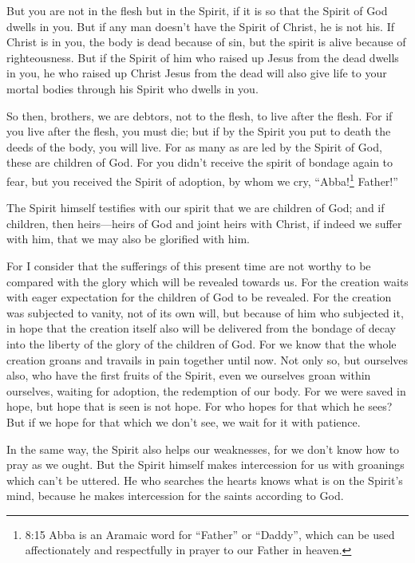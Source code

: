  But you are not in the flesh but in the Spirit, if it is so
that the Spirit of God dwells in you. But if any man doesn't have the
Spirit of Christ, he is not his.  If Christ is in you, the
body is dead because of sin, but the spirit is alive because of
righteousness.  But if the Spirit of him who raised up
Jesus from the dead dwells in you, he who raised up Christ Jesus from
the dead will also give life to your mortal bodies through his Spirit
who dwells in you.

 So then, brothers, we are debtors, not to the flesh, to
live after the flesh.  For if you live after the flesh, you
must die; but if by the Spirit you put to death the deeds of the body,
you will live.  For as many as are led by the Spirit of
God, these are children of God.  For you didn't receive the
spirit of bondage again to fear, but you received the Spirit of
adoption, by whom we cry, ``Abba!\footnote{8:15 Abba is an Aramaic word
  for ``Father'' or ``Daddy'', which can be used affectionately and
  respectfully in prayer to our Father in heaven.} Father!''

 The Spirit himself testifies with our spirit that we are
children of God;  and if children, then heirs---heirs of
God and joint heirs with Christ, if indeed we suffer with him, that we
may also be glorified with him.

 For I consider that the sufferings of this present time
are not worthy to be compared with the glory which will be revealed
towards us.  For the creation waits with eager expectation
for the children of God to be revealed.  For the creation
was subjected to vanity, not of its own will, but because of him who
subjected it, in hope  that the creation itself also will
be delivered from the bondage of decay into the liberty of the glory of
the children of God.  For we know that the whole creation
groans and travails in pain together until now.  Not only
so, but ourselves also, who have the first fruits of the Spirit, even we
ourselves groan within ourselves, waiting for adoption, the redemption
of our body.  For we were saved in hope, but hope that is
seen is not hope. For who hopes for that which he sees? 
But if we hope for that which we don't see, we wait for it with
patience.

 In the same way, the Spirit also helps our weaknesses, for
we don't know how to pray as we ought. But the Spirit himself makes
intercession for us with groanings which can't be uttered. 
He who searches the hearts knows what is on the Spirit's mind, because
he makes intercession for the saints according to God.

